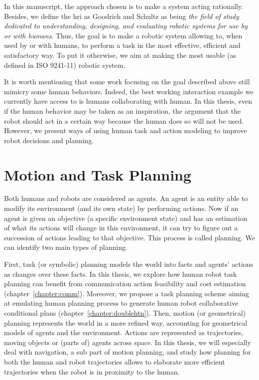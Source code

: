 \documentclass[a4paper,11pt,twoside]{StyleThese}
\begin{document}
In this manuscript, the approach chosen is to make a system acting rationally. Besides, we define the \acrfull{hri} as Goodrich and Schultz as being \textit{the field of study dedicated to understanding, designing, and evaluating robotic systems for use by or with humans}. Thus, the goal is to make a robotic system allowing to, when used by or with humans, to perform a task in the most effective, efficient and satisfactory way. To put it otherwise, we aim at making the most usable (as defined in ISO 9241-11) robotic system.

It is worth mentioning that some work focusing on the goal described above still mimicry some human behaviors. Indeed, the best working interaction example we currently have access to is humans collaborating with human. In this thesis, even if the human behavior may be taken as an inspiration, the argument that the robot should act in a certain way because the human does so will not be used. However, we present ways of using human task and action modeling to improve robot decisions and planning.



\section*{Motion and Task Planning}
Both humans and robots are considered as agents. An agent is an entity able to modify its environment (and its own state) by performing actions. Now if an agent is given an objective (a specific environment state) and has an estimation of what its actions will change in this environment, it can try to figure out a succession of actions leading to that objective. This process is called planning. We can identify two main types of planning. 

First, task (or symbolic) planning models the world into facts and agents' actions as changes over these facts. In this thesis, we explore how human robot task planning can benefit from communication action feasibility and cost estimation (chapter~\ref{chapter:comm}). Moreover, we propose a task planning scheme aiming at emulating human planning process to generate human robot collaborative conditional plans (chapter~\ref{chapter:doublehtn}). Then, motion (or geometrical) planning represents the world in a more refined way, accounting for geometrical models of agents and the environment. Actions are represented as trajectories, moving objects or (parts of) agents across space. In this thesis, we will especially deal with navigation, a sub part of motion planning, and study how planning for both the human and robot trajectories allows to elaborate more efficient trajectories when the robot is in proximity to the human.
\end{document}
